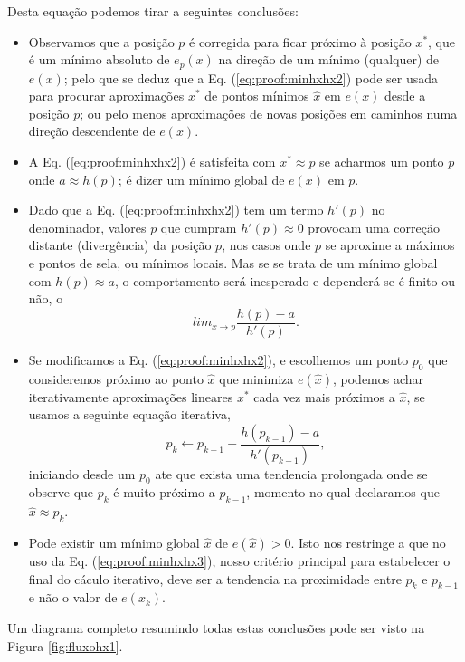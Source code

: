 \begin{myproofT}
Desta equação podemos tirar a seguintes conclusões:
\begin{itemize}

\item Observamos que a posição $p$ é corregida para ficar próximo à posição $x^*$, 
que é um mínimo absoluto de $e_p(x)$ na direção de um mínimo (qualquer) de $e(x)$;
pelo que se deduz que a Eq. (\ref{eq:proof:minhxhx2})
pode ser usada para procurar aproximações $x^*$ de pontos mínimos $\hat{x}$ em $e(x)$ desde a posição $p$;
ou pelo menos aproximações de novas posições em caminhos numa direção descendente de $e(x)$.

\item A Eq. (\ref{eq:proof:minhxhx2}) é satisfeita 
com $x^* \approx p$ se acharmos um  
ponto $p$ onde  $a \approx h(p)$; 
é dizer um mínimo global de $e(x)$ em $p$.%

\item Dado que a Eq. (\ref{eq:proof:minhxhx2}) tem um termo $h'(p)$ no denominador,
valores $p$ que cumpram $h'(p)\approx 0$ provocam uma correção distante (divergência) da posição $p$,
nos casos onde $p$ se aproxime a máximos e pontos de sela,
ou mínimos locais. 
Mas se se trata de um mínimo global com $h(p)\approx a$, 
o comportamento será inesperado e dependerá se é finito ou não, o
\begin{equation}
lim_{x\rightarrow p } \frac{h(p)-a}{h'(p)}.
\end{equation}

\item Se modificamos a Eq. (\ref{eq:proof:minhxhx2}), e escolhemos um ponto  
$p_0$ que consideremos próximo ao ponto $\hat{x}$ que minimiza $e(\hat{x})$,
podemos achar iterativamente aproximações lineares $x^*$ cada vez mais próximos a  $\hat{x}$,
se usamos a seguinte equação iterativa,
\begin{equation}\label{eq:proof:minhxhx3}
p_{k} \leftarrow p_{k-1} - \frac{ h(p_{k-1})-a}{h'(p_{k-1})},
\end{equation}
iniciando desde um $p_{0}$ 
ate que exista uma tendencia prolongada onde se observe que $p_{k}$ é muito próximo a $p_{k-1}$,
momento no qual declaramos que $\hat{x} \approx p_{k}$.
\item Pode existir um mínimo global $\hat{x}$ de $e(\hat{x})>0$.
Isto nos restringe a que no uso da Eq. (\ref{eq:proof:minhxhx3}),
nosso critério principal para estabelecer o final do cáculo iterativo,
deve ser a tendencia na  proximidade entre $p_{k}$ e $p_{k-1}$ 
e não o valor de $e(x_k)$.
\end{itemize}

Um diagrama completo resumindo todas estas conclusões pode ser visto na Figura \ref{fig:fluxohx1}.
\end{myproofT}



